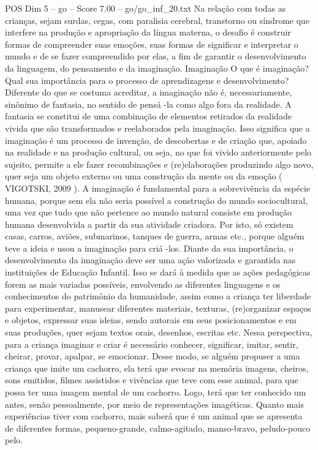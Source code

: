 \begin{textsample}{POS Dim 5 – go – Score 7.00 – go/go\_inf\_20.txt}
Na relação com todas as crianças, sejam surdas, cegas, com paralisia cerebral, transtorno ou síndrome que interfere na produção e apropriação da língua materna, o desafio é construir formas de compreender suas emoções, suas formas de significar e interpretar o mundo e de se fazer compreendido por elas, a fim de garantir o desenvolvimento da linguagem, do pensamento e da imaginação.
Imaginação O que é imaginação?
Qual sua importância para o processo de aprendizagens e desenvolvimento?
Diferente do que se costuma acreditar, a imaginação não é, necessariamente, sinônimo de fantasia, no sentido de pensá -la como algo fora da realidade.
A fantasia se constitui de uma combinação de elementos retirados da realidade vivida que são transformados e reelaborados pela imaginação.
Isso significa que a imaginação é um processo de invenção, de descobertas e de criação que, apoiado na realidade e na produção cultural, ou seja, no que foi vivido anteriormente pelo sujeito, permite a ele fazer recombinações e (re)elaborações produzindo algo novo, quer seja um objeto externo ou uma construção da mente ou da emoção ( VIGOTSKI, 2009 ).
A imaginação é fundamental para a sobrevivência da espécie humana, porque sem ela não seria possível a construção do mundo sociocultural, uma vez que tudo que não pertence ao mundo natural consiste em produção humana desenvolvida a partir da sua atividade criadora.
Por isto, só existem casas, carros, aviões, submarinos, tanques de guerra, armas etc., porque alguém teve a ideia e usou a imaginação para criá -los.
Diante da sua importância, o desenvolvimento da imaginação deve ser uma ação valorizada e garantida nas instituições de Educação Infantil.
Isso se dará à medida que as ações pedagógicas forem as mais variadas possíveis, envolvendo as diferentes linguagens e os conhecimentos do patrimônio da humanidade, assim como a criança ter liberdade para experimentar, manusear diferentes materiais, texturas, (re)organizar espaços e objetos, expressar suas ideias, sendo autorais em seus posicionamentos e em suas produções, quer sejam textos orais, desenhos, escritas etc.
Nessa perspectiva, para a criança imaginar e criar é necessário conhecer, significar, imitar, sentir, cheirar, provar, apalpar, se emocionar.
Desse modo, se alguém propuser a uma criança que imite um cachorro, ela terá que evocar na memória imagens, cheiros, sons emitidos, filmes assistidos e vivências que teve com esse animal, para que possa ter uma imagem mental de um cachorro.
Logo, terá que ter conhecido um antes, senão pessoalmente, por meio de representações imagéticas.
Quanto mais experiências tiver com cachorro, mais saberá que é um animal que se apresenta de diferentes formas, pequeno-grande, calmo-agitado, manso-bravo, peludo-pouco pelo.

\end{textsample}
